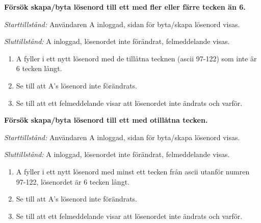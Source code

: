 \documentclass[a4paper]{article}
\begin{document}
\begin{FT}
\item
\textbf{Försök skapa/byta lösenord till ett med fler eller färre tecken än 6.}

\emph{Starttillstånd:} Användaren A inloggad, sidan för byta/skapa lösenord visas.

\emph{Sluttillstånd:} A inloggad, lösenordet inte förändrat, felmeddelande visas.

\begin{enumerate}
\item A fyller i ett nytt lösenord med de tillåtna tecknen (ascii 97-122) som inte är 6 tecken långt.
\item Se till att A's lösenord inte förändrats.
\item Se till att ett felmeddelande visar att lösenordet inte ändrats och varför.
\end{enumerate}

\item
\textbf{Försök skapa/byta lösenord till ett med otillåtna tecken.}

\emph{Starttillstånd:} Användaren A inloggad, sidan för byta/skapa lösenord visas.

\emph{Sluttillstånd:} A inloggad, lösenordet inte förändrat, felmeddelande visas.

\begin{enumerate}
\item A fyller i ett nytt lösenord med minst ett tecken från ascii utanför numren 97-122, lösenordet är 6 tecken långt.
\item Se till att A's lösenord inte förändrats.
\item Se till att ett felmeddelande visar att lösenordet inte ändrats och varför.
\end{enumerate}

\end{FT}
\end{document}
